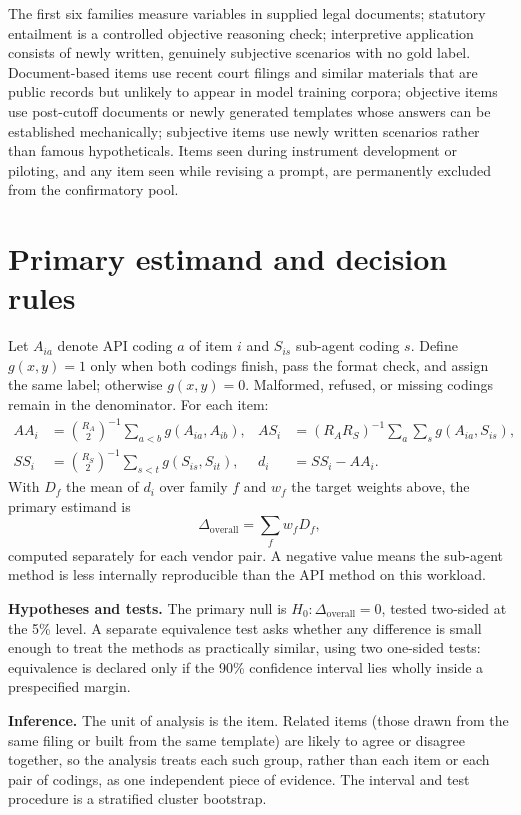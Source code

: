 \documentclass[12pt]{article}
\begin{document}
The first six families measure variables in supplied legal documents; statutory entailment is a controlled objective reasoning check; interpretive application consists of newly written, genuinely subjective scenarios with no gold label. Document-based items use recent court filings and similar materials that are public records but unlikely to appear in model training corpora; objective items use post-cutoff documents or newly generated templates whose answers can be established mechanically; subjective items use newly written scenarios rather than famous hypotheticals. Items seen during instrument development or piloting, and any item seen while revising a prompt, are permanently excluded from the confirmatory pool.

\section{Primary estimand and decision rules}

Let $A_{ia}$ denote API coding $a$ of item $i$ and $S_{is}$ sub-agent coding $s$. Define $g(x,y)=1$ only when both codings finish, pass the format check, and assign the same label; otherwise $g(x,y)=0$. Malformed, refused, or missing codings remain in the denominator. For each item:
\begin{align*}
AA_i &= \binom{R_A}{2}^{-1}\sum_{a<b} g(A_{ia},A_{ib}), &
AS_i &= (R_A R_S)^{-1}\sum_a\sum_s g(A_{ia},S_{is}),\\
SS_i &= \binom{R_S}{2}^{-1}\sum_{s<t} g(S_{is},S_{it}), &
d_i  &= SS_i-AA_i.
\end{align*}
With $D_f$ the mean of $d_i$ over family $f$ and $w_f$ the target weights above, the primary estimand is
\[
\Delta_{\mathrm{overall}}=\sum_f w_f D_f,
\]
computed separately for each vendor pair. A negative value means the sub-agent method is less internally reproducible than the API method on this workload.

\textbf{Hypotheses and tests.} The primary null is $H_0:\Delta_{\mathrm{overall}}=0$, tested two-sided at the 5\% level. A separate equivalence test asks whether any difference is small enough to treat the methods as practically similar, using two one-sided tests: equivalence is declared only if the 90\% confidence interval lies wholly inside a prespecified margin.

\textbf{Inference.} The unit of analysis is the item. Related items (those drawn from the same filing or built from the same template) are likely to agree or disagree together, so the analysis treats each such group, rather than each item or each pair of codings, as one independent piece of evidence. The interval and test procedure is a stratified cluster bootstrap.
\end{document}
